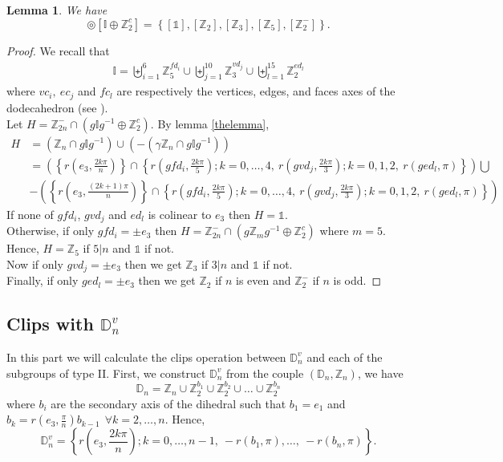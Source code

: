 \documentclass[11pt,a4paper]{amsart}
\newtheorem{lem}[thm]{Lemma}
\theoremstyle{definition}
\newcommand{\ZZ}{\mathbb{Z}}                %
\newcommand{\ico}{\mathbb{I}}               %
\newcommand{\DD}{\mathbb{D}}                %
\newcommand{\1}{\mathds{1}}		            %
\newcommand{\set}[1]{\left\{#1\right\}}     %
\begin{document}
\begin{lem}
We have
\begin{equation*}
[\ZZ_{2n}^-]\circledcirc[\ico\oplus \ZZ_2^c]=\set{[\1],[\ZZ_2],[\ZZ_3],[\ZZ_5],[\ZZ_2^-]}.
\end{equation*}
\end{lem}
\begin{proof}
We recall that
\begin{align*}
\ico= \displaystyle \biguplus_{i=1}^6 \ZZ_5^{fd_i} \cup \biguplus_{j=1}^{10} \ZZ_3^{vd_j}\cup \biguplus_{l=1}^{15} \ZZ_2^{ed_l}
\end{align*}
where $vc_i,\ ec_j$ and $fc_l$ are respectively the vertices, edges, and faces axes of the dodecahedron (see \cite[Appendix A]{olive2019}).\\
Let $H=\ZZ_{2n}^- \cap (g \ico g^{-1}\oplus \ZZ_2^c)$.
By lemma \ref{thelemma},
\begin{align*}
H&=(\ZZ_n\cap g \ico g^{-1})\cup (-(\gamma\ZZ_n\cap g \ico g^{-1}))\\
 &=\left(\set{r(e_3,\frac{2k\pi}{n})} \cap \set{r(gfd_i,\frac{2k\pi}{5});k=0,\dotsc,4,\ r(g vd_j,\frac{2k\pi}{3});k=0,1,2,\ r(g ed_l,\pi)}\right)\bigcup\\
 &-\left(\set{r(e_3,\frac{(2k+1)\pi}{n})}\cap \set{r(gfd_i,\frac{2k\pi}{5});k=0,\dotsc,4,\ r(g vd_j,\frac{2k\pi}{3});k=0,1,2,\ r(g ed_l,\pi)}\right)
\end{align*}
If none of $gfd_i$, $gvd_j$ and $ ed_l$ is colinear to $e_3$ then $H=\1$.\\
Otherwise, if only $gfd_i=\pm e_3$ then $H=\ZZ_{2n}^- \cap (g\ZZ_m g^{-1}\oplus \ZZ_2^c)$ where $m=5$. Hence, $H=\ZZ_5$ if $5|n$ and $\1$ if not. \\
Now if only $gvd_j=\pm e_3$ then we get $\ZZ_3$ if $3|n$ and $\1$ if not.\\
Finally, if only $ged_l=\pm e_3$ then we get $\ZZ_2$ if $n$ is even and $\ZZ_2^-$ if $n$ is odd.
\end{proof}

\subsection{Clips with $\DD_{n}^v$}
\par In this part we will calculate the clips operation between $\DD_{n}^v$ and each of the subgroups of type II. First, we construct $\DD_{n}^v$ from the couple $(\DD_{n},\ZZ_n)$, we have
\begin{equation*}
\DD_n=\ZZ_n\cup \ZZ_2^{b_1} \cup \ZZ_2^{b_2} \cup \dotsc \cup \ZZ_2^{b_n}
\end{equation*}
where $b_i$ are the secondary axis of the dihedral such that $b_1=e_1$ and $b_k=r(e_3,\frac{\pi}{n})b_{k-1}\ \ \forall k =2,\dotsc,n$.
Hence,
\begin{equation*}
\DD_{n}^v=\set{r(e_3,\frac{2k\pi}{n});k=0,\dotsc,n-1,\ -r(b_1,\pi),\dotsc,\ -r(b_n,\pi)}.
\end{equation*}
\end{document}
